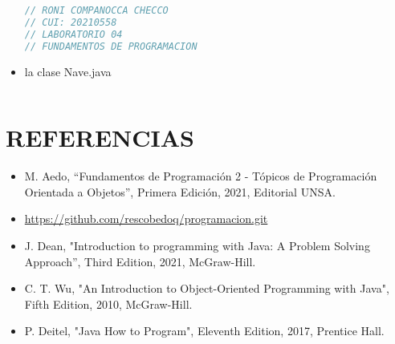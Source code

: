 \documentclass{article}
\begin{document}
\begin{itemize}
        \begin{lstlisting}[language=java]
        // RONI COMPANOCCA CHECCO
// CUI: 20210558
// LABORATORIO 04
// FUNDAMENTOS DE PROGRAMACION 

        \end{lstlisting}

        \item la clase Nave.java
        \begin{lstlisting}[language=java]

         \end{lstlisting}
    
	\end{itemize}
	
	\section{REFERENCIAS}
	\begin{itemize}
		\item M. Aedo, “Fundamentos de Programación 2 - Tópicos de Programación Orientada a Objetos”, Primera Edición, 2021, Editorial UNSA.
		\item \url{https://github.com/rescobedoq/programacion.git}
		\item J. Dean, "Introduction to programming with Java: A Problem Solving Approach”, Third Edition, 2021, McGraw-Hill.
        \item C. T. Wu, "An Introduction to Object-Oriented Programming with Java", Fifth Edition, 2010, McGraw-Hill.
        \item P. Deitel, "Java How to Program", Eleventh Edition, 2017, Prentice Hall.
	\end{itemize}
	
%
%
%
			
\end{document}
